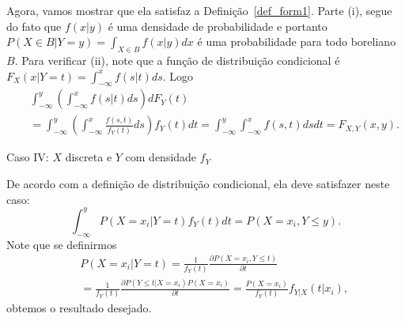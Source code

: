 \begin{frame}
\begin{block}{}
	Agora,
	vamos mostrar que ela satisfaz a Definição~\ref{def_form1}. Parte
	(i), segue do fato que $f(x|y)$ é uma densidade de probabilidade e
	portanto $P(X\in B|Y=y)=\int_{X\in B} f(x|y)dx$ é uma probabilidade
	para todo boreliano $B$. Para verificar (ii), note que a função de
	distribuição condicional é $F_X(x|Y=t)=\int_{-\infty}^{x}f(s|t)ds$.
	Logo
	\begin{eqnarray}
	& & \int_{-\infty}^{y}(\int_{-\infty}^{x}f(s|t)ds)dF_Y(t)\nonumber\\
	& & =
	\int_{-\infty}^{y}(\int_{-\infty}^{x}\frac{f(s,t)}{f_Y(t)}ds)f_Y(t)dt=\int_{-\infty}^{y} \int_{-\infty}^{x} f(s,t)ds dt=F_{X,Y}(x,y).\nonumber
	\end{eqnarray}
	\end{block}

\begin{block}{Caso IV: $X$ discreta e $Y$ com densidade $f_Y$}

De acordo com a definição de distribuição condicional, ela deve satisfazer neste caso:
$$\int_{-\infty}^{y}P(X=x_i|Y=t)f_Y(t)dt=P(X=x_i,Y\leq y).$$
Note que se definirmos
\begin{eqnarray}
& & P(X=x_i|Y=t)=\frac{1}{f_Y(t)}\frac{\partial P(X=x_i,Y\leq t)}{\partial t}\nonumber \\
& &=\frac{1}{f_Y(t)}\frac{\partial P(Y\leq t|X=x_i)P(X=x_i)}{\partial t}  = \frac{P(X=x_i)}{f_Y(t)}f_{Y|X}(t|x_i), \nonumber
\end{eqnarray}
obtemos o resultado desejado.

\end{block}
\end{frame}

